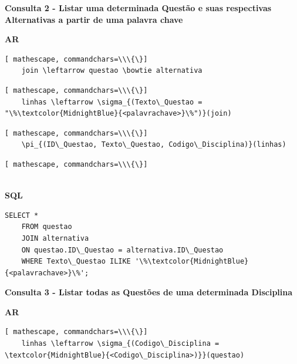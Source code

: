 \documentclass[12pt,a4paper]{article}
\begin{document}
\vspace{0.5cm}
\begin{center}
    \textbf{Consulta 2 - Listar uma determinada Questão e suas respectivas Alternativas a partir de uma palavra chave }
\end{center}
\begin{center}
    \textbf{AR}
\end{center}

\begin{Verbatim}[ mathescape, commandchars=\\\{\}]
    join \leftarrow questao \bowtie alternativa 
\end{Verbatim}
\begin{Verbatim}[ mathescape, commandchars=\\\{\}]
    linhas \leftarrow \sigma_{(Texto\_Questao = "\%\textcolor{MidnightBlue}{<palavrachave>}\%")}(join)
\end{Verbatim}
\begin{Verbatim}[ mathescape, commandchars=\\\{\}]
    \pi_{(ID\_Questao, Texto\_Questao, Codigo\_Disciplina)}(linhas)
\end{Verbatim}

\begin{Verbatim}[ mathescape, commandchars=\\\{\}]
    
\end{Verbatim}

\begin{center}
    \textbf{SQL}
\end{center}
\begin{Verbatim}[commandchars=\\\{\}]
    SELECT *
    FROM questao 
    JOIN alternativa 
    ON questao.ID\_Questao = alternativa.ID\_Questao 
    WHERE Texto\_Questao ILIKE '\%\textcolor{MidnightBlue}{<palavrachave>}\%';
\end{Verbatim}

\vspace{0.5cm}
\begin{center}
    \textbf{Consulta 3 - Listar todas as Questões de uma determinada Disciplina }
\end{center}
\begin{center}
    \textbf{AR}
\end{center}
\begin{Verbatim}[ mathescape, commandchars=\\\{\}]
    linhas \leftarrow \sigma_{(Codigo\_Disciplina = \textcolor{MidnightBlue}{<Codigo\_Disciplina>)}}(questao)
\end{Verbatim}
\end{document}
